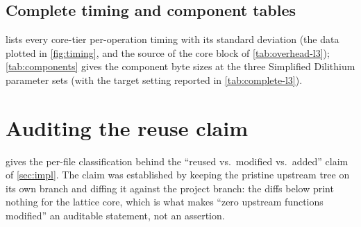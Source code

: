 \FloatBarrier

\subsection{Complete timing and component tables}

 lists every core-tier per-operation timing with its standard deviation
(the data plotted in \cref{fig:timing}, and the source of the core block of
\cref{tab:overhead-l3}); \cref{tab:components} gives the component byte sizes at the
three Simplified Dilithium parameter sets (with the target setting reported in
\cref{tab:complete-l3}).

\begin{table}[!htbp]
  \centering
  \caption[Per-operation timing across the parameter sets]{\small
  Core-tier timings ($\mu$s per operation; mean $\pm$ sample standard deviation)
  from the parameter-matched benchmark. KeyGen, Sign and Verify are the reused basic
  operations; PreSign, PreVerify, Adapt and Extract are LAS adaptor operations.
  Setup is a one-time cost and is omitted.}
  \label{tab:timing}
  \footnotesize
  \setlength{\tabcolsep}{5pt}
  
\end{table}

\begin{table}[!htbp]
  \centering
  \caption[LAS objects by component (packed bytes)]{\small
  Packed LAS component sizes. The challenge travels as the digest $\tilde c$,
  while $z$ dominates each signature. The target-setting column corresponds to
  \cref{tab:complete-l3}.}
  \label{tab:components}
  \footnotesize
  
\end{table}

\FloatBarrier
\endgroup

\section{Auditing the reuse claim}
\label{app:diff}

 gives the per-file classification behind the ``reused vs.\ modified
vs.\ added'' claim of \cref{sec:impl}. The claim was established by keeping the pristine
upstream tree on its own branch and diffing it against the project branch: the diffs
below print nothing for the lattice core, which is what makes ``zero upstream functions
modified'' an auditable statement, not an assertion.

